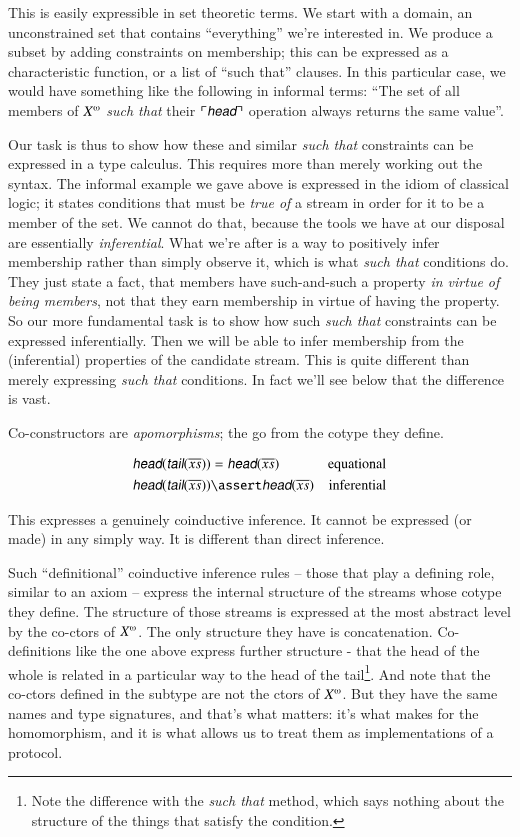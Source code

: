 \documentclass{article}
\begin{document}
This is easily expressible in set theoretic terms. We start with a
domain, an unconstrained set that contains ``everything'' we're
interested in. We produce a subset by adding constraints on
membership; this can be expressed as a characteristic function, or a
list of ``such that'' clauses. In this particular case, we would have
something like the following in informal terms: ``The set of all
members of \(\colist{X}\) \textit{such that} their
\(\ulcorner\head{}\urcorner\) operation always returns the same
value''.

Our task is thus to show how these and similar \textit{such that}
constraints can be expressed in a type calculus. This requires more
than merely working out the syntax. The informal example we gave above
is expressed in the idiom of classical logic; it states conditions
that must be \textit{true of} a stream in order for it to be a member
of the set. We cannot do that, because the tools we have at our
disposal are essentially \textit{inferential}. What we're after is a
way to positively infer membership rather than simply observe it,
which is what \textit{such that} conditions do. They just state a
fact, that members have such-and-such a property \textit{in virtue of
  being members}, not that they earn membership in virtue of having
the property. So our more fundamental task is to show how such
\textit{such that} constraints can be expressed inferentially. Then we
will be able to infer membership from the (inferential) properties of
the candidate stream. This is quite different than merely expressing
\textit{such that} conditions. In fact we'll see below that the
difference is vast.

Co-constructors are \textit{apomorphisms}; the go from the cotype they
define.

\begin{align}
 \cohead(\cotail(\coseq{x})) & = \cohead(\coseq{x}) & \text{equational} \\
  \cohead(\cotail(\coseq{x})) & \linfer \cohead(\coseq{x}) & \text{inferential}
\end{align}

This expresses a genuinely coinductive inference. It cannot be
expressed (or made) in any simply way. It is different than direct
inference.

Such ``definitional'' coinductive inference rules -- those that play a
defining role, similar to an axiom -- express the internal structure
of the streams whose cotype they define. The structure of those
streams is expressed at the most abstract level by the co-ctors of
\(\colist{X}\). The only structure they have is concatenation.
Co-definitions like the one above express further structure - that the
head of the whole is related in a particular way to the head of the
tail\footnote{Note the difference with the \textit{such that} method,
which says nothing about the structure of the things that satisfy the
condition.}. And note that the co-ctors defined in the subtype are not
the ctors of \(\colist{X}\). But they have the same names and type
signatures, and that's what matters: it's what makes for the
homomorphism, and it is what allows us to treat them as
implementations of a protocol.
\end{document}
